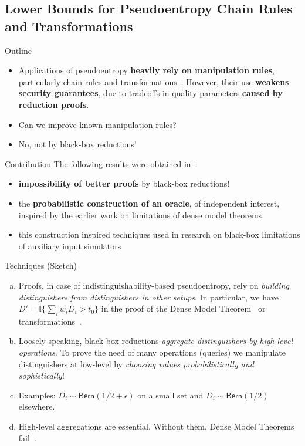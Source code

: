 \documentclass[9pt]{beamer}					%
\begin{document}
\subsection{Lower Bounds for Pseudoentropy Chain Rules and Transformations }

\begin{frame}{Outline}
\begin{itemize}
\item[\emoji{open-book}] Applications of pseudoentropy \textbf{heavily rely on manipulation rules}, particularly chain rules and transformations~\cite{DBLP:conf/random/BarakSW03,DBLP:conf/tcc/FullerOR12}. However, their use \textbf{weakens security guarantees}, due to tradeoffs in quality parameters \textbf{caused by reduction proofs}.
\item[\emoji{question}] Can we improve known manipulation rules?
\item[\emoji{raised-hand}] No, not by black-box reductions!
\end{itemize}
\end{frame}

\begin{frame}{Contribution}
The following results were obtained in~\cite{pietrzak2016pseudoentropy}:
\begin{itemize}
    \item[\emoji{key}] \textbf{impossibility of better proofs} by black-box reductions!
    \item[\emoji{key}] the \textbf{probabilistic construction of an oracle}, of independent interest, inspired by the earlier work on limitations of dense model theorems~\cite{DBLP:journals/eccc/Zhang11}
    \item[\emoji{fire}] this construction inspired techniques used in research on black-box limitations of auxiliary input simulators~\cite{Chen_2018}
\end{itemize}
\end{frame}

\begin{frame}{Techniques (Sketch)}
\newcommand{\D}{\mathsf{\D}}
\begin{enumerate}[(a)]
    \item Proofs, in case of indistinguishability-based pseudoentropy, rely on \emph{building distinguishers from distinguishers in other setups}. In particular, we have 
    $D' = \mathbb{I}\{\sum_i w_i D_i > t_0\}$  in the proof of the Dense Model Theorem~\cite{DBLP:journals/eccc/Zhang11} or transformations~\cite{skorski2015new}.
    \item Loosely speaking, black-box reductions \emph{aggregate distinguishers by high-level operations}. To prove the need of many operations (queries) we manipulate distinguishers at low-level by \emph{choosing values probabilistically and sophistically}!
    \item Examples: $D_i\sim \mathsf{Bern}(1/2+\epsilon)$ on a small set and $D_i\sim \mathsf{Bern}(1/2)$ elsewhere.
    \item[\emoji{warning}] High-level aggregations are essential. Without them, Dense Model Theorems fail~\cite{impagliazzo2020comparing}.
\end{enumerate}
\end{frame}
\end{document}
